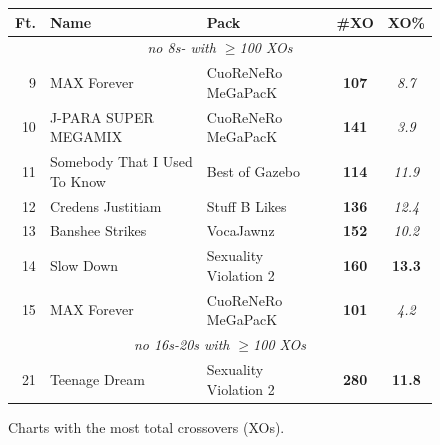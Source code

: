 \documentclass[10pt]{sigplanconf}
\begin{document}
\begin{figure}[t]
	\begin{center}
		\small
	\begin{tabular}{r|l|l|c|c}
		\bf Ft. & \bf Name & \bf Pack & \bf \#XO & \bf XO\% \\
		\hline
		\multicolumn{5}{c}{\em no 8s- with $\ge$100 XOs} \\
		 9 & MAX Forever              & CuoReNeRo MeGaPacK    & \bf 107 & \em 8.7 \\
		10 & J-PARA SUPER MEGAMIX     & CuoReNeRo MeGaPacK    & \bf 141 & \em 3.9 \\
		11 & Somebody That I Used To Know & Best of Gazebo    & \bf 114 & \em 11.9 \\
		12 & Credens Justitiam        & Stuff B Likes         & \bf 136 & \em 12.4 \\
		13 & Banshee Strikes          & VocaJawnz             & \bf 152 & \em 10.2 \\
		14 & Slow Down                & Sexuality Violation 2 & \bf 160 & \bf 13.3 \\
		15 & MAX Forever              & CuoReNeRo MeGaPacK    & \bf 101 & \em 4.2 \\
		\multicolumn{5}{c}{\em no 16s-20s with $\ge$100 XOs} \\
		21 & Teenage Dream            & Sexuality Violation 2 & \bf 280 & \bf 11.8 \\
	\end{tabular}
	\end{center}
	\caption{Charts with the most total crossovers (XOs).}
\end{figure}
\end{document}
